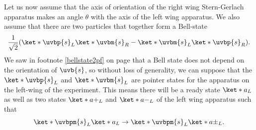 \documentclass[12pt]{report}
\providecommand{\DIFaddbegin}{} %
\providecommand{\DIFaddend}{} %
\providecommand{\DIFdelbegin}{} %
\providecommand{\DIFdelend}{} %
\begin{document}
Let us now assume that the axis of orientation of the right wing Stern-Gerlach apparatus makes an angle $\theta$ with the axis of the left wing apparatus. We also assume that there are two particles that together form a Bell-state \begin{equation}\label{bellstatePI}
	\frac{1}{\sqrt{2}}(\ket*{\uvbp{s}}_L\ket*{\uvbm{s}}_R-\ket*{\uvbm{s}}_L\ket*{\uvbp{s}}_R).
\end{equation}
We saw  in footnote \ref{bellstate2pf} on page \pageref{bellstate2pf} that a Bell state does not depend on the orientation of $\uvb{s}$, so without loss of generality, we can suppose that the $\ket*{\uvbp{s}}_L$ and $\ket*{\uvbm{s}}_L$ %
%
 are pointer states for the apparatus on the left-wing of the experiment. This means there will be a ready state $\ket*{a}_L$  %
  as well as two states $\ket*{a+}_L$ and $\ket*{a-}_L$ %
  \DIFdelbegin %
\DIFdelend \DIFaddbegin {}\DIFaddend %
   of the left wing apparatus such that 
$$\ket*{\uvbpm{s}}_L\ket*{a}_L\rightarrow\ket*{\uvbpm{s}}_L\ket*{a\pm}_L.$$
\end{document}
